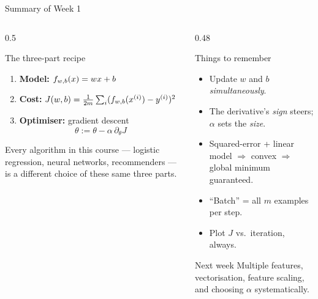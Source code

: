 \documentclass[aspectratio=169,11pt]{beamer}
\begin{document}
\begin{frame}{Summary of Week 1}
  \small
  \begin{columns}[T,onlytextwidth]
    \begin{column}{0.5\textwidth}
      \begin{block}{The three-part recipe}
        \begin{enumerate}
          \item \textbf{Model:} $f_{w,b}(x)=wx+b$
          \item \textbf{Cost:} $J(w,b)=\frac{1}{2m}\sum_i(f_{w,b}(x^{(i)})-y^{(i)})^2$
          \item \textbf{Optimiser:} gradient descent
            \[ \theta := \theta - \alpha\,\partial_\theta J \]
        \end{enumerate}
        Every algorithm in this course --- logistic regression, neural networks,
        recommenders --- is a different choice of these same three parts.
      \end{block}
    \end{column}
    \begin{column}{0.48\textwidth}
      \begin{block}{Things to remember}
        \begin{itemize}
          \item Update $w$ and $b$ \emph{simultaneously}.
          \item The derivative's \emph{sign} steers; $\alpha$ sets the \emph{size}.
          \item Squared-error + linear model $\Rightarrow$ convex $\Rightarrow$
                global minimum guaranteed.
          \item ``Batch'' = all $m$ examples per step.
          \item Plot $J$ vs.\ iteration, always.
        \end{itemize}
      \end{block}
      \begin{block}{Next week}
        \small Multiple features, vectorisation, feature scaling, and choosing
        $\alpha$ systematically.
      \end{block}
    \end{column}
  \end{columns}
\end{frame}
\end{document}
